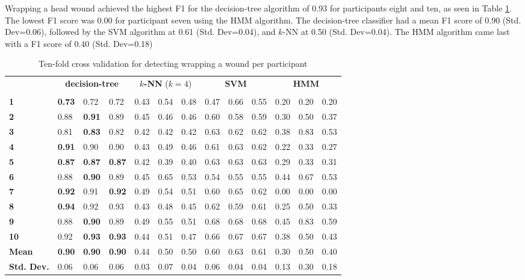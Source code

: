 \par Wrapping a head wound achieved the highest F1 for the decision-tree algorithm of 0.93 for participants eight and ten, as seen in Table \ref{tab:w:ml}. The lowest F1 score was 0.00 for participant seven using the HMM algorithm. The decision-tree classifier had a mean F1 score of 0.90 (Std. Dev=0.06), followed by the SVM algorithm at 0.61 (Std. Dev=0.04), and $k$-NN at 0.50 (Std. Dev=0.04). The HMM algorithm came last with a F1 score of 0.40 (Std. Dev=0.18)
\begin{table}[]
	\centering
	\begin{tabular}{lllllllllllll}
		\multirow{2}{*}{\rotatebox[origin=c]{45}{\textbf{Participant}}} & \multicolumn{3}{c}{\textbf{decision-tree}} & \multicolumn{3}{c}{\textbf{$k$-NN} ($k=4$)} & \multicolumn{3}{c}{\textbf{SVM}} & \multicolumn{3}{c}{\textbf{HMM}} \\
		& \rot{Precision}     & \rot{Recall}    & \rot{F1}    & \rot{Precision}     & \rot{Recall}    & \rot{F1}  & \rot{Precision}     & \rot{Recall}    & \rot{F1} & \rot{Precision}     & \rot{Recall}    & \rot{F1} \\
		\textbf{1}   & \textbf{0.73} & 0.72 & 0.72 & 0.43 & 0.54 & 0.48 & 0.47 & 0.66 & 0.55 & 0.20 & 0.20 & 0.20 \\
		\textbf{2}   & 0.88 & \textbf{0.91} & 0.89 & 0.45 & 0.46 & 0.46 & 0.60 & 0.58 & 0.59 & 0.30 & 0.50 & 0.37 \\
		\textbf{3}   & 0.81 & \textbf{0.83} & 0.82 & 0.42 & 0.42 & 0.42 & 0.63 & 0.62 & 0.62 & 0.38 & 0.83 & 0.53 \\
		\textbf{4}   & \textbf{0.91} & 0.90 & 0.90 & 0.43 & 0.49 & 0.46 & 0.61 & 0.63 & 0.62 & 0.22 & 0.33 & 0.27 \\
		\textbf{5}   & \textbf{0.87} & \textbf{0.87} & \textbf{0.87} & 0.42 & 0.39 & 0.40 & 0.63 & 0.63 & 0.63 & 0.29 & 0.33 & 0.31 \\
		\textbf{6}   & 0.88 & \textbf{0.90} & 0.89 & 0.45 & 0.65 & 0.53 & 0.54 & 0.55 & 0.55 & 0.44 & 0.67 & 0.53 \\
		\textbf{7}   & \textbf{0.92} & 0.91 & \textbf{0.92} & 0.49 & 0.54 & 0.51 & 0.60 & 0.65 & 0.62 & 0.00 & 0.00 & 0.00 \\
		\textbf{8}   & \textbf{0.94} & 0.92 & 0.93 & 0.43 & 0.48 & 0.45 & 0.62 & 0.59 & 0.61 & 0.25 & 0.50 & 0.33 \\
		\textbf{9}   & 0.88 & \textbf{0.90} & 0.89 & 0.49 & 0.55 & 0.51 & 0.68 & 0.68 & 0.68 & 0.45 & 0.83 & 0.59 \\
		\textbf{10} & 0.92 & \textbf{0.93} & \textbf{0.93} & 0.44 & 0.51 & 0.47 & 0.66 & 0.67 & 0.67 & 0.38 & 0.50 & 0.43 \\
		\hline
		\textbf{Mean} & \textbf{0.90} & \textbf{0.90} & \textbf{0.90} & 0.44 & 0.50 & 0.50 & 0.60 & 0.63 & 0.61 & 0.30 & 0.50 & 0.40 \\
		\textbf{Std. Dev.} & 0.06 & 0.06 & 0.06 & 0.03 & 0.07 & 0.04 & 0.06 & 0.04 & 0.04 & 0.13 & 0.30 & 0.18
	\end{tabular}
	\caption{Ten-fold cross validation for detecting wrapping a wound per participant}
	\label{tab:w:ml}
\end{table}

